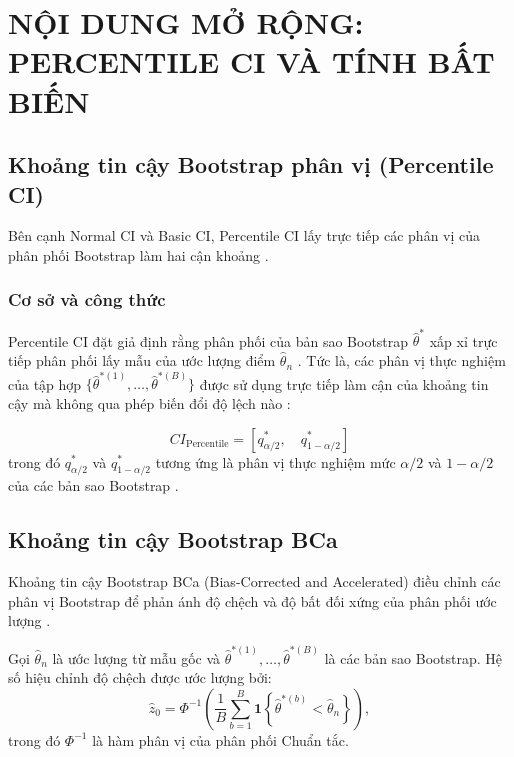 \section{NỘI DUNG MỞ RỘNG: PERCENTILE CI VÀ TÍNH BẤT BIẾN}

\subsection{Khoảng tin cậy Bootstrap phân vị (Percentile CI)}

Bên cạnh Normal CI và Basic CI, Percentile CI lấy trực tiếp các phân vị của phân phối Bootstrap làm hai cận khoảng \cite{efron1993}.

\subsubsection{Cơ sở và công thức}
Percentile CI đặt giả định rằng phân phối của bản sao Bootstrap $\hat{\theta}^*$ xấp xỉ trực tiếp phân phối lấy mẫu của ước lượng điểm $\hat{\theta}_n$ \cite{efron1993}. Tức là, các phân vị thực nghiệm của tập hợp $\{\hat{\theta}^{*(1)}, \dots, \hat{\theta}^{*(B)}\}$ được sử dụng trực tiếp làm cận của khoảng tin cậy mà không qua phép biến đổi độ lệch nào \cite{efron1993}:

\begin{equation}
	CI_{\text{Percentile}} = \left[ q_{\alpha/2}^*, \quad q_{1-\alpha/2}^* \right]
\end{equation}
trong đó $q_{\alpha/2}^*$ và $q_{1-\alpha/2}^*$ tương ứng là phân vị thực nghiệm mức $\alpha/2$ và $1-\alpha/2$ của các bản sao Bootstrap \cite{buithuytrang2026}.
\subsection{Khoảng tin cậy Bootstrap BCa}

Khoảng tin cậy Bootstrap BCa (Bias-Corrected and Accelerated) điều chỉnh
các phân vị Bootstrap để phản ánh độ chệch và độ bất đối xứng của phân phối
ước lượng \cite{efron1993, davison1997}.

Gọi $\hat{\theta}_n$ là ước lượng từ mẫu gốc và
$\hat{\theta}^{*(1)},\ldots,\hat{\theta}^{*(B)}$ là các bản sao Bootstrap.
Hệ số hiệu chỉnh độ chệch được ước lượng bởi:
\begin{equation}
	\widehat{z}_0
	=
	\Phi^{-1}\left(
	\frac{1}{B}\sum_{b=1}^{B}
	\mathbf{1}\left\{
	\hat{\theta}^{*(b)} < \hat{\theta}_n
	\right\}
	\right),
\end{equation}
trong đó $\Phi^{-1}$ là hàm phân vị của phân phối Chuẩn tắc.

